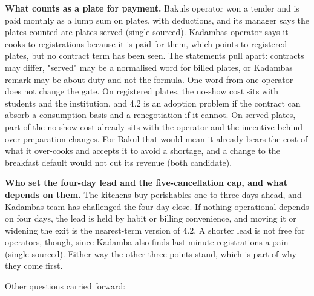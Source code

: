 \documentclass[
  10pt,
  table]{article}
\begin{document}
\textbf{What counts as a plate for payment.} Bakul\textquotesingle s operator won a tender and is paid monthly as a lump sum on plates, with deductions, and its manager says the plates counted are plates served (single-sourced). Kadamba\textquotesingle s operator says it cooks to registrations because it is paid for them, which points to registered plates, but no contract term has been seen. The statements pull apart: contracts may differ, "served" may be a normalised word for billed plates, or Kadamba\textquotesingle s remark may be about duty and not the formula. One word from one operator does not change the gate. On registered plates, the no-show cost sits with students and the institution, and 4.2 is an adoption problem if the contract can absorb a consumption basis and a renegotiation if it cannot. On served plates, part of the no-show cost already sits with the operator and the incentive behind over-preparation changes. For Bakul that would mean it already bears the cost of what it over-cooks and accepts it to avoid a shortage, and a change to the breakfast default would not cut its revenue (both candidate).

\textbf{Who set the four-day lead and the five-cancellation cap, and what depends on them.} The kitchens buy perishables one to three days ahead, and Kadamba\textquotesingle s team has challenged the four-day close. If nothing operational depends on four days, the lead is held by habit or billing convenience, and moving it or widening the exit is the nearest-term version of 4.2. A shorter lead is not free for operators, though, since Kadamba also finds last-minute registrations a pain (single-sourced). Either way the other three points stand, which is part of why they come first.

Other questions carried forward:
\end{document}
